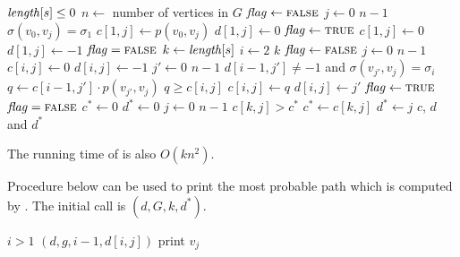 \documentclass[a4paper, fleqn]{article}
\begin{document}
\begin{enumerate}
\begin{codebox}
\li \If $\id{length}[s] \leq 0$
\li   \Then
        \Return {}
      \End
\li $n \gets$ number of vertices in $G$
\li $\id{flag} \gets \const{false}$
\li \For $j \gets 0$ \To $n-1$
\li   \Do
        \If $\sigma(v_0, v_j) = \sigma_1$
\li       \Then
            $c[1,j] \gets p(v_0, v_j)$
\li         $d[1,j] \gets 0$
\li         $\id{flag} \gets \const{true}$
\li       \Else
            $c[1,j] \gets 0$
\li         $d[1,j] \gets -1$
          \End
      \End
\li \If $\id{flag} = \const{false}$
\li   \Then
        \Return {}
      \End
\li $k \gets \id{length}[s]$
\li \For $i \gets 2$ \To $k$
\li   \Do
        $\id{flag} \gets \const{false}$
\li     \For $j \gets 0$ \To $n-1$
\li       \Do
            $c[i,j] \gets 0$
\li         $d[i,j] \gets -1$
\li         \For $j' \gets 0$ \To $n-1$
\li           \Do
                \If $d[i-1,j'] \neq -1$ and
                    $\sigma(v_{j'}, v_j) = \sigma_i$
\li               \Then
                    $q \gets c[i-1,j'] \cdot p(v_{j'}, v_j)$
\li                 \If $q \geq c[i,j]$
\li                   \Then
                        $c[i,j] \gets q$
\li                     $d[i,j] \gets j'$
\li                     $\id{flag} \gets \const{true}$
                      \End
                  \End
              \End  %
          \End  %
\li     \If $\id{flag} = \const{false}$
\li       \Then
            \Return {}
          \End
      \End  %
\li $c^* \gets 0$
\li $d^* \gets 0$
\li \For $j \gets 0$ \To $n-1$
\li   \Do
        \If $c[k,j] > c^*$
\li       \Then
            $c^* \gets c[k,j]$
\li         $d^* \gets j$
          \End
      \End
\li \Return $c$, $d$ and $d^*$
\end{codebox}

The running time of  is also $O(kn^2)$.

Procedure  below can be used to print the most
probable path which is computed by . The initial call
is $(d, G, k, d^*)$.

\begin{codebox}
\li \If $i > 1$
\li   \Then
        $(d, g, i-1, d[i,j])$
      \End
\li print $v_j$
\end{codebox}

\end{enumerate}
\end{document}
